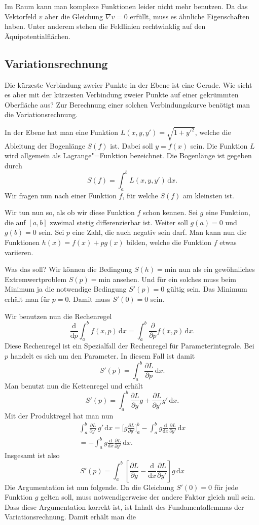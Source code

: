 \documentclass[a4paper,10pt,fleqn,twocolumn,twoside]{article}
\begin{document}
Im Raum kann man komplexe Funktionen leider nicht mehr benutzen.
Da das Vektorfeld \(\underline v\) aber die Gleichung
\(\nabla\underline v=0\) erfüllt, muss es ähnliche Eigenschaften
haben. Unter anderem stehen die Feldlinien rechtwinklig auf den
Äquipotentialflächen.


\subsection{Variationsrechnung}

Die kürzeste Verbindung zweier Punkte in der Ebene ist eine Gerade.
Wie sieht es aber mit der kürzesten Verbindung zweier Punkte auf
einer gekrümmten Oberfläche aus? Zur Berechnung einer solchen
Verbindungskurve benötigt man die Variationsrechnung.

In der Ebene hat man eine Funktion \(L(x,y,y') = \sqrt{1+y'^2}\),
welche die Ableitung der Bogenlänge \(S(f)\) ist. Dabei soll
\(y=f(x)\) sein. Die Funktion \(L\) wird allgemein als
Lagrange"=Funktion bezeichnet. Die Bogenlänge ist gegeben durch
\[S(f) = \int_a^b L(x,y,y')\,\mathrm dx.\]
Wir fragen nun nach einer Funktion \(f\), für welche \(S(f)\) am
kleinsten ist.

Wir tun nun so, als ob wir diese Funktion \(f\) schon kennen.
Sei \(g\) eine Funktion, die auf \([a,b]\) zweimal stetig
differenzierbar ist. Weiter soll \(g(a)=0\) und \(g(b)=0\)
sein. Sei \(p\) eine Zahl, die auch negativ sein darf. Man
kann nun die Funktionen \(h(x)=f(x)+pg(x)\) bilden, welche
die Funktion \(f\) etwas variieren.

Was das soll? Wir können die Bedingung \(S(h)=\mathrm{min}\) nun als
ein gewöhnliches Extremwertproblem \(S(p)=\mathrm{min}\) ansehen.
Und für ein solches muss beim Minimum ja die notwendige Bedingung
\(S'(p)=0\) gültig sein. Das Minimum erhält man für \(p=0\).
Damit muss \(S'(0)=0\) sein.

Wir benutzen nun die Rechenregel
\[\frac{\mathrm d}{\mathrm dp}\int_a^b f(x,p)\,\mathrm dx =
\int_a^b \frac{\partial}{\partial p}f(x,p)\,\mathrm dx.\]
Diese Rechenregel ist ein Spezialfall der Rechenregel für
Parameterintegrale. Bei \(p\) handelt es sich um den Parameter.
In diesem Fall ist damit
\[S'(p) = \int_a^b \frac{\partial L}{\partial p}\,\mathrm dx.\]
Man benutzt nun die Kettenregel und erhält
\[S'(p) = \int_a^b \frac{\partial L}{\partial y}g+\frac{\partial L}{\partial y'}g'\,\mathrm dx.\]
Mit der Produktregel hat man nun
\begin{gather*}
\int_a^b \frac{\partial L}{\partial y'}\,g'\,\mathrm dx
= \Big[g\frac{\partial L}{\partial y'}\Big]_a^b
- \int_a^b g \frac{\mathrm d}{\mathrm dx}
\frac{\partial L}{\partial y'}\,\mathrm dx\\
= - \int_a^b g \frac{\mathrm d}{\mathrm dx}
\frac{\partial L}{\partial y'}\,\mathrm dx.
\end{gather*}
Insgesamt ist also
\[S'(p) = \int_a^b \left[\frac{\partial L}{\partial y}
-\frac{\mathrm d}{\mathrm dx}\frac{\partial L}{\partial y'}
\right]g\,\mathrm dx\]
Die Argumentation ist nun folgende. Da die Gleichung \(S'(0)=0\)
für jede Funktion \(g\) gelten soll, muss notwendigerweise der andere
Faktor gleich null sein. Dass diese Argumentation korrekt ist, ist
Inhalt des Fundamentallemmas der Variationsrechnung.
Damit erhält man die
\end{document}
